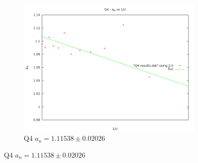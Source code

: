 \begin{figure}[H]
\begin{subfigure}[b]{0.45\textwidth}
   \includegraphics[width=\textwidth]{4-Results/Q4-Verification.png}
    \caption{Q4 $a_n = 1.11538 \pm 0.02026$}
\end{subfigure}


\end{figure}
